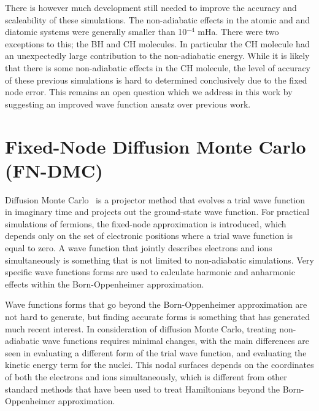 \documentclass[aip,jcp,numerical,reprint]{revtex4-1}
\begin{document}
There is however much development still needed to improve the accuracy and scaleability of these simulations.  The non-adiabatic effects in the atomic and and diatomic systems were generally smaller than 10$^{-4}$ mHa. There were two exceptions to this; the BH and CH molecules. In particular the CH molecule had an unexpectedly large contribution to the non-adiabatic energy.   While it is likely that there is some non-adiabatic effects in the CH molecule, the level of accuracy of these previous simulations is hard to determined conclusively due to the fixed node error.   This remains an open question which we address in this work by suggesting an improved wave function ansatz over previous work.


\section{Fixed-Node Diffusion Monte Carlo (FN-DMC)}
Diffusion Monte Carlo~\cite{Anderson_DMC,lester1,Stuart_Review,Needs_Review,Needs_Old_Review,QMC_Review} is a projector method that evolves a trial wave function in imaginary time and projects out the ground-state wave function. For practical simulations of fermions, the fixed-node approximation is introduced, which depends only on the set of electronic positions where a trial wave function is equal to zero.  A wave function that jointly describes electrons and ions simultaneously is something that is not limited to non-adiabatic simulations.    Very specific wave functions forms are used to calculate harmonic and anharmonic effects within the Born-Oppenheimer approximation.  

  Wave functions forms that go beyond the Born-Oppenheimer approximation are not hard to generate, but finding accurate forms is something that has generated  much recent interest.  In consideration of diffusion Monte Carlo, treating non-adiabatic wave functions requires minimal changes, with the main differences are seen in evaluating a different form of the trial wave function, and  evaluating the kinetic energy term for the nuclei.   This nodal surfaces  depends on the coordinates of both the electrons and ions simultaneously, which is different from other standard methods that have been used to treat Hamiltonians beyond the Born-Oppenheimer approximation.%
\end{document}
